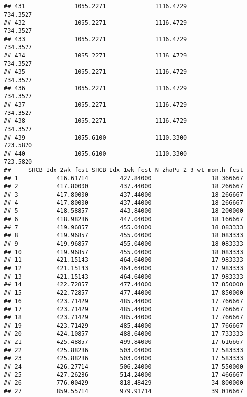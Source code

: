 \documentclass[]{article}
\begin{document}
\begin{verbatim}
## 431              1065.2271              1116.4729            734.3527
## 432              1065.2271              1116.4729            734.3527
## 433              1065.2271              1116.4729            734.3527
## 434              1065.2271              1116.4729            734.3527
## 435              1065.2271              1116.4729            734.3527
## 436              1065.2271              1116.4729            734.3527
## 437              1065.2271              1116.4729            734.3527
## 438              1065.2271              1116.4729            734.3527
## 439              1055.6100              1110.3300            723.5820
## 440              1055.6100              1110.3300            723.5820
##     SHCB_Idx_2wk_fcst SHCB_Idx_1wk_fcst N_ZhaPu_2_3_wt_month_fcst
## 1           416.61714         427.84000                 18.366667
## 2           417.80000         437.44000                 18.266667
## 3           417.80000         437.44000                 18.266667
## 4           417.80000         437.44000                 18.266667
## 5           418.58857         443.84000                 18.200000
## 6           418.98286         447.04000                 18.166667
## 7           419.96857         455.04000                 18.083333
## 8           419.96857         455.04000                 18.083333
## 9           419.96857         455.04000                 18.083333
## 10          419.96857         455.04000                 18.083333
## 11          421.15143         464.64000                 17.983333
## 12          421.15143         464.64000                 17.983333
## 13          421.15143         464.64000                 17.983333
## 14          422.72857         477.44000                 17.850000
## 15          422.72857         477.44000                 17.850000
## 16          423.71429         485.44000                 17.766667
## 17          423.71429         485.44000                 17.766667
## 18          423.71429         485.44000                 17.766667
## 19          423.71429         485.44000                 17.766667
## 20          424.10857         488.64000                 17.733333
## 21          425.48857         499.84000                 17.616667
## 22          425.88286         503.04000                 17.583333
## 23          425.88286         503.04000                 17.583333
## 24          426.27714         506.24000                 17.550000
## 25          427.26286         514.24000                 17.466667
## 26          776.00429         818.48429                 34.800000
## 27          859.55714         979.91714                 39.016667

\end{verbatim}
\end{document}
